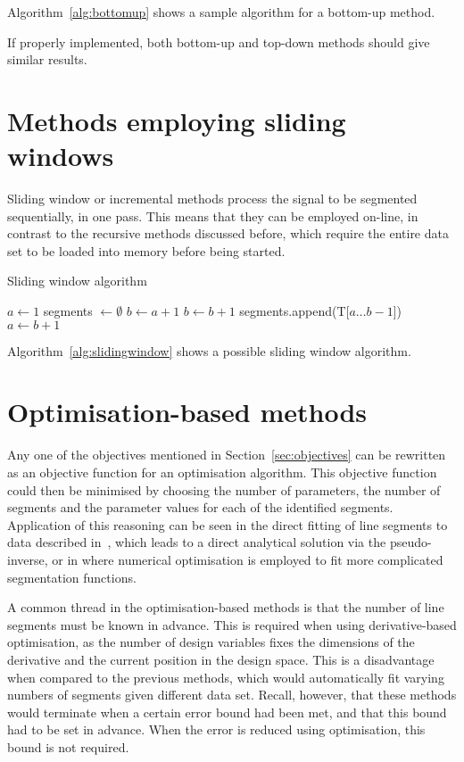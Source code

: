Algorithm~\ref{alg:bottomup} shows a sample algorithm for a bottom-up
method.

If properly implemented, both bottom-up and top-down methods should give similar results.

\section{Methods employing sliding windows}
Sliding window or incremental methods process the signal to be segmented sequentially, in one pass.
This means that they can be employed on-line, in contrast to the recursive methods discussed before, which require the entire data set to be loaded into memory before being started.

\begin{algorithm}
  \caption{Sliding window algorithm}
  \label{alg:slidingwindow}
  \begin{algorithmic}
    \State $a \gets 1$
    \State segments $\gets\emptyset$
    \State $b\gets a+1$
    \State $b \gets b + 1$
    \EndWhile
    \State segments.append(T[$a\dots b-1$])
    \State $a \gets b + 1$
    \EndWhile
    \EndFunction
  \end{algorithmic}
\end{algorithm}

Algorithm~\ref{alg:slidingwindow} shows a possible sliding window algorithm.

\section{Optimisation-based methods}
Any one of the objectives mentioned in Section~\ref{sec:objectives} can be rewritten as an objective function for an optimisation algorithm.
This objective function could then be minimised by choosing the number of parameters, the number of segments and the parameter values for each of the identified segments.
Application of this reasoning can be seen in the direct fitting of line segments to data described in~\citet{cantoni1971optimal}, which leads to a direct analytical solution via the pseudo-inverse, or in where numerical optimisation is employed to fit more complicated segmentation functions.

A common thread in the optimisation-based methods is that the number of line segments must be known in advance.
This is required when using derivative-based optimisation, as the number of design variables fixes the dimensions of the derivative and the current position in the design space.
This is a disadvantage when compared to the previous methods, which would automatically fit varying numbers of segments given different data set.
Recall, however, that these methods would terminate when a certain error bound had been met, and that this bound had to be set in advance.
When the error is reduced using optimisation, this bound is not required.

